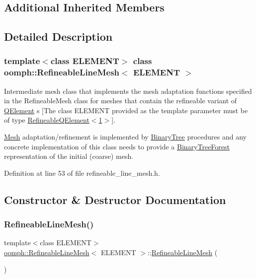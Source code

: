 \subsection*{Additional Inherited Members}


\subsection{Detailed Description}
\subsubsection*{template$<$class E\+L\+E\+M\+E\+NT$>$\newline
class oomph\+::\+Refineable\+Line\+Mesh$<$ E\+L\+E\+M\+E\+N\+T $>$}

Intermediate mesh class that implements the mesh adaptation functions specified in the Refineable\+Mesh class for meshes that contain the refineable variant of \hyperlink{classoomph_1_1QElement}{Q\+Element} s \mbox{[}The class E\+L\+E\+M\+E\+NT provided as the template parameter must be of type \hyperlink{classoomph_1_1RefineableQElement_3_011_01_4}{Refineable\+Q\+Element$<$1$>$}\mbox{]}.

\hyperlink{classoomph_1_1Mesh}{Mesh} adaptation/refinement is implemented by \hyperlink{classoomph_1_1BinaryTree}{Binary\+Tree} procedures and any concrete implementation of this class needs to provide a \hyperlink{classoomph_1_1BinaryTreeForest}{Binary\+Tree\+Forest} representation of the initial (coarse) mesh. 

Definition at line 53 of file refineable\+\_\+line\+\_\+mesh.\+h.



\subsection{Constructor \& Destructor Documentation}
\mbox{\label{classoomph_1_1RefineableLineMesh_a971ed8cade766ab0d19aa35c2276f771}} 
\subsubsection{\texorpdfstring{Refineable\+Line\+Mesh()}{RefineableLineMesh()}\hspace{0.1cm}{\footnotesize\ttfamily [1/2]}}
{\footnotesize\ttfamily template$<$class E\+L\+E\+M\+E\+NT$>$ \\
\hyperlink{classoomph_1_1RefineableLineMesh}{oomph\+::\+Refineable\+Line\+Mesh}$<$ E\+L\+E\+M\+E\+NT $>$\+::\hyperlink{classoomph_1_1RefineableLineMesh}{Refineable\+Line\+Mesh} (\begin{DoxyParamCaption}{ }\end{DoxyParamCaption})\hspace{0.3cm}{\ttfamily [inline]}}



